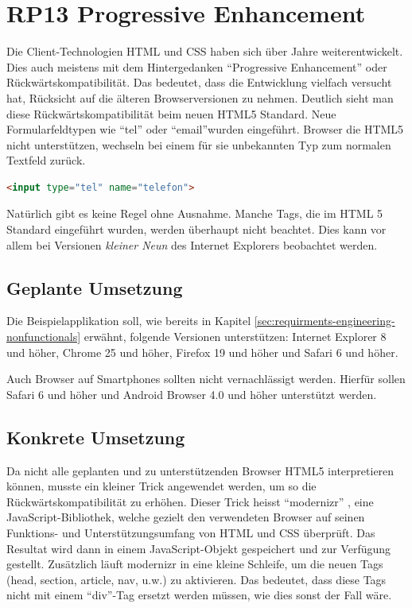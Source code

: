 \section{RP13 Progressive Enhancement}
\label{sec:principle-rp13-progressive-enhancement}

Die Client-Technologien HTML und CSS haben sich über Jahre weiterentwickelt. Dies auch meistens mit dem Hintergedanken ``Progressive Enhancement'' oder Rückwärtskompatibilität. Das bedeutet, dass die Entwicklung vielfach versucht hat, Rücksicht auf die älteren Browserversionen zu nehmen.
Deutlich sieht man diese Rückwärtskompatibilität beim neuen HTML5 Standard. Neue Formularfeldtypen wie ``tel'' oder ``email''wurden eingeführt. Browser die HTML5 nicht unterstützen, wechseln bei einem für sie unbekannten Typ zum normalen Textfeld zurück.

\begin{lstlisting}[language=HTML, caption={Formularfeld mit HTML5, welches eine Telefonnummer erwartet}, label={lst:html5TelInput}]
<input type="tel" name="telefon">
\end{lstlisting}

Natürlich gibt es keine Regel ohne Ausnahme. Manche Tags, die im HTML 5 Standard eingeführt wurden, werden überhaupt nicht beachtet. Dies kann vor allem bei Versionen \emph{kleiner Neun} des Internet Explorers beobachtet werden.

\subsection*{Geplante Umsetzung}
Die Beispielapplikation soll, wie bereits in Kapitel \ref{sec:requirments-engineering-nonfunctionals} erwähnt, folgende Versionen unterstützen: Internet Explorer 8 und höher, Chrome 25 und höher, Firefox 19 und höher und Safari 6 und höher.

Auch Browser auf Smartphones sollten nicht vernachlässigt werden. Hierfür sollen Safari 6 und höher und Android Browser 4.0 und höher unterstützt werden.

\subsection*{Konkrete Umsetzung}
Da nicht alle geplanten und zu unterstützenden Browser HTML5 interpretieren können, musste ein kleiner Trick angewendet werden, um so die Rückwärtskompatibilität zu erhöhen. Dieser Trick heisst ``modernizr'' \cite{modernizr}, eine JavaScript-Bibliothek, welche gezielt den verwendeten Browser auf seinen Funktions- und Unterstützungsumfang von HTML und CSS überprüft. Das Resultat wird dann in einem JavaScript-Objekt gespeichert und zur Verfügung gestellt.  Zusätzlich läuft modernizr in eine kleine Schleife, um die neuen Tags (head, section, article, nav, u.w.) zu aktivieren. Das bedeutet, dass diese Tags nicht mit einem ``div''-Tag ersetzt werden müssen, wie dies sonst der Fall wäre.

